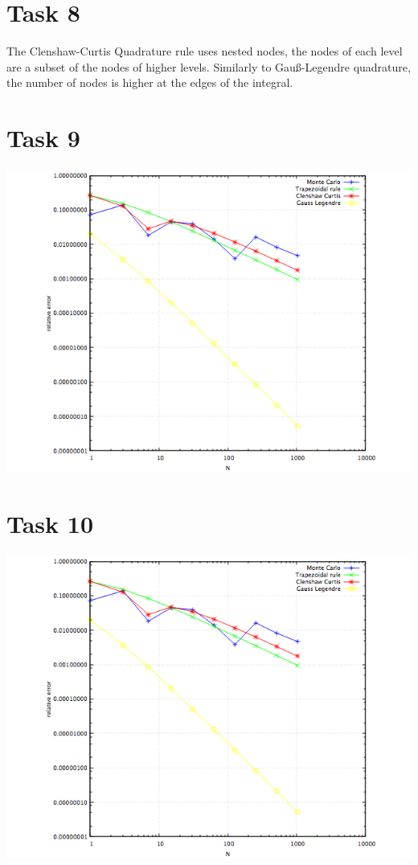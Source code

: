 \documentclass[10pt,a4paper]{article}
\begin{document}
\section*{Task 8}

The Clenshaw-Curtis Quadrature rule uses nested nodes, the nodes of each level are a subset of the nodes of higher levels. Similarly to Gauß-Legendre quadrature, the number of nodes is higher at the edges of the integral. 

\section*{Task 9}

\begin{center}
\includegraphics[scale=0.5]{relative_errors_K0.png}		
\end{center}	

\section*{Task 10}

\begin{center}
\includegraphics[scale=0.5]{relative_errors_K0.png}		
\end{center}	
\end{document}
